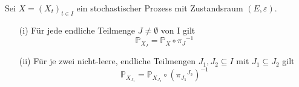 \label{Teilmengen Lemma}
Sei $X = {(X_{t})}_{t\in I}$ ein stochastischer Prozess mit Zustandsraum $(E,\varepsilon)$.
\begin{itemize}
\item[(i)] Für jede endliche Teilmenge $J \neq \emptyset$ von I gilt
\begin{equation*}
{{\mathbb{P}}_{X_{J}}} = {\mathbb{P}}_{X} \circ {\pi_{J}}^{-1}
\end{equation*}
\item[(ii)] Für je zwei nicht-leere, endliche Teilmengen $J_{1},J_{2} \subseteq I$ mit $J_{1} \subseteq J_{2}$ gilt
\begin{equation*}
{{\mathbb{P}}_{X_{J_{1}}}} = {\mathbb{P}}_{X_{J_{2}}} \circ {({\pi_{J_{1}}}^{J_{2}})}^{-1}
\end{equation*}
\end{itemize}